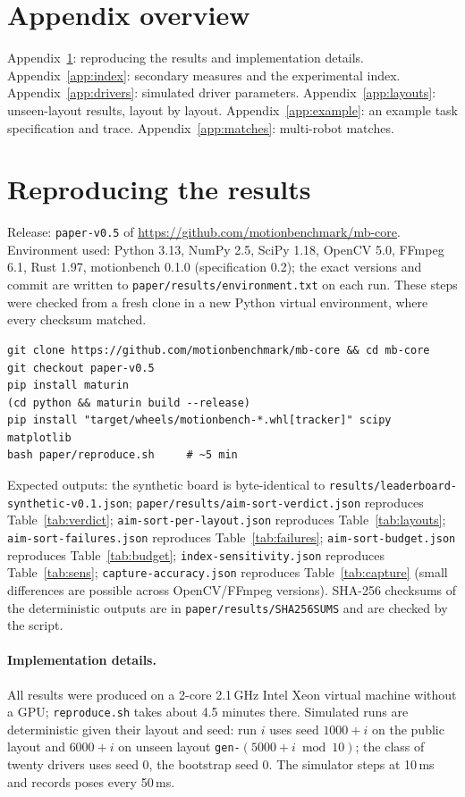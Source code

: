 \documentclass[11pt]{article}
\newcommand{\release}{\texttt{paper-v0.5}}
\begin{document}



\appendix
\sloppy

\section*{Appendix overview}
Appendix~\ref{app:repro}: reproducing the results and implementation details.
Appendix~\ref{app:index}: secondary measures and the experimental index.
Appendix~\ref{app:drivers}: simulated driver parameters.
Appendix~\ref{app:layouts}: unseen-layout results, layout by layout.
Appendix~\ref{app:example}: an example task specification and trace.
Appendix~\ref{app:matches}: multi-robot matches.

\section{Reproducing the results}\label{app:repro}
\small
Release: \release{} of \url{https://github.com/motionbenchmark/mb-core}. Environment used: Python 3.13,
NumPy 2.5, SciPy 1.18, OpenCV 5.0, FFmpeg 6.1, Rust 1.97, motionbench 0.1.0 (specification 0.2); the
exact versions and commit are written to \texttt{paper/results/environment.txt} on each run. These
steps were checked from a fresh clone in a new Python virtual environment, where every checksum
matched.
\begin{verbatim}
git clone https://github.com/motionbenchmark/mb-core && cd mb-core
git checkout paper-v0.5
pip install maturin
(cd python && maturin build --release)
pip install "target/wheels/motionbench-*.whl[tracker]" scipy matplotlib
bash paper/reproduce.sh     # ~5 min
\end{verbatim}
Expected outputs: the synthetic board is byte-identical to \texttt{results/leaderboard-synthetic-v0.1.json};
\texttt{paper/results/aim-sort-verdict.json} reproduces Table~\ref{tab:verdict};
\texttt{aim-sort-per-layout.json} reproduces Table~\ref{tab:layouts}; \texttt{aim-sort-failures.json}
reproduces Table~\ref{tab:failures}; \texttt{aim-sort-budget.json} reproduces Table~\ref{tab:budget}; \texttt{index-sensitivity.json} reproduces Table~\ref{tab:sens};
\texttt{capture-accuracy.json} reproduces Table~\ref{tab:capture} (small differences are possible
across OpenCV/FFmpeg versions). SHA-256 checksums of the deterministic outputs are in
\texttt{paper/results/SHA256SUMS} and are checked by the script.

\paragraph{Implementation details.} All results were produced on a 2-core 2.1\,GHz Intel Xeon virtual
machine without a GPU; \texttt{reproduce.sh} takes about 4.5 minutes there. Simulated runs are
deterministic given their layout and seed: run $i$ uses seed $1000+i$ on the public layout and
$6000+i$ on unseen layout \texttt{gen-}$(5000 + i \bmod 10)$; the class of twenty drivers uses seed 0,
the bootstrap seed 0. The simulator steps at 10\,ms and records poses every 50\,ms.
\normalsize
\end{document}
